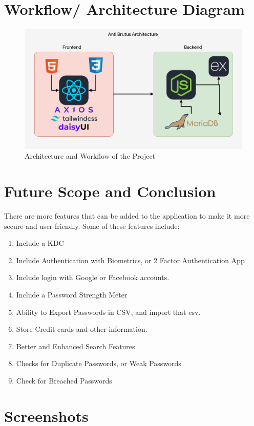 \documentclass[11pt]{article}
\begin{document}
\section{Workflow/ Architecture Diagram}

\begin{figure}[H]
    \centering
    \includegraphics[width=.95\textwidth]{anti brutus arch.png}
    \caption{Architecture and Workflow of the Project}
\end{figure}

\section{Future Scope and Conclusion}

There are more features that can be added to the application to make it more secure and user-friendly. Some of these features include:
\begin{enumerate}
    \item Include a KDC
    \item Include Authentication with Biometrics, or 2 Factor Authentication App
    \item Include login with Google or Facebook accounts.
    \item Include a Password Strength Meter
    \item Ability to Export Passwords in CSV, and import that csv.
    \item Store Credit cards and other information.
    \item Better and Enhanced Search Features
    \item Checks for Duplicate Passwords, or Weak Passwords
    \item Check for Breached Passwords
\end{enumerate}


\section{Screenshots}
\end{document}
